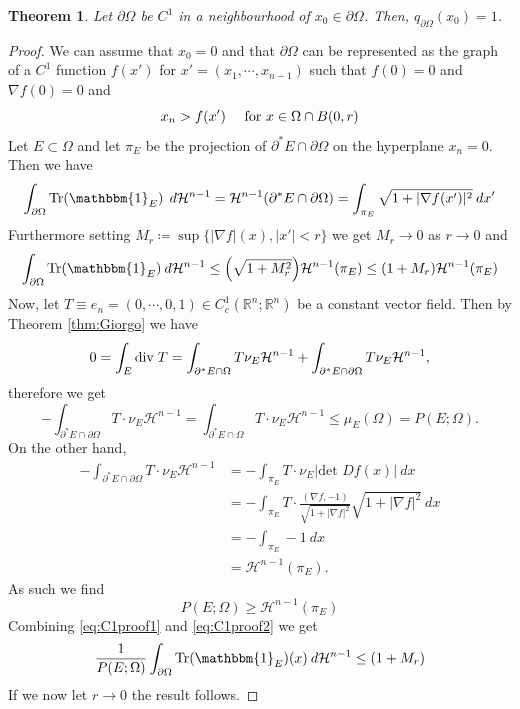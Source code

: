 \documentclass[artcle, 11pt, reqno]{amsart}
\numberwithin{equation}{section}
\newcommand{\R}{\mathbb{R}}
\newcommand{\Hd}{\mathcal{H}}
\newcommand{\pom}{{\partial \Omega}}
\newcommand{\ind}{\mathbbm{1}}
\newcommand{\contvf}{C^1_c(\R^n; \R^n)}
\newcommand{\dd}{\: d}
\newcommand{\divv}{\textnormal{div} \;}
\DeclareMathOperator{\Tr}{Tr}
\theoremstyle{plain}
\newtheorem{theorem}{Theorem}
\theoremstyle{definition}
\theoremstyle{remark}
\begin{document}
	\begin{theorem} \label{thm:Giusti}
		Let $\pom$ be $C^1$ in a neighbourhood of $x_0 \in \pom$. Then, $q_{\pom}(x_0) = 1$.
	\end{theorem}
	
	\begin{proof}
		We can assume that $x_0=0$ and that $\pom$ can be represented as the graph of a $C^1$ function $f(x')$ for $x'=(x_1, \cdots, x_{n-1})$ such that $f(0)=0$ and $\nabla f(0) = 0$ and
		\[
		x_n > f(x') \quad \textnormal{ for } x \in \Omega \cap B(0,r) 
		\]
		Let $E \subset \Omega$ and let $\pi_E$ be the projection of  $\partial^\ast E \cap \pom$ on the hyperplane $x_n=0$. Then we have 
		\begin{equation*}
			\int_{\pom} \Tr(\ind_E) \: \dd \Hd^{n-1} = \Hd^{n-1}(\partial^\ast E \cap \pom) = \int_{\pi_E} \sqrt{1+|\nabla f(x')|^2} \dd x'
		\end{equation*}
		Furthermore setting $M_r \coloneqq \sup \{|\nabla f|(x), |x'| < r \}$ we get $M_r \rightarrow 0$ as $r \rightarrow 0$ and 
		\begin{equation} \label{eq:C1proof1}
			\int_\pom \Tr(\ind_E) \dd \Hd^{n-1} \leq
			\Bigl(\sqrt{1+M_r^2}\Bigr)\Hd^{n-1}(\pi_E)
			\leq
			(1+M_r)\Hd^{n-1}(\pi_E)
		\end{equation} 
		Now, let $T  \equiv e_n = (0, \cdots, 0, 1) \in \contvf$ be a constant vector field. Then by Theorem \ref{thm:Giorgo} we have
		\[
		0 = \int_E \divv T = \int_{\partial^\ast E \cap \Omega} T \nu_E \Hd^{n-1} + \int_{\partial^\ast E \cap \partial \Omega} T \nu_E \Hd^{n-1},  
		\]
		therefore  we get 
		\[
		- \int_{\partial^\ast E \cap \partial \Omega} T \cdot \nu_E \Hd^{n-1} = \int_{\partial^\ast E \cap \Omega} T \cdot \nu_E \Hd^{n-1} \leq \mu_E(\Omega) = P(E;\Omega). 
		\]
		On the other hand, 
		\begin{align*}
			-\int_{\partial^\ast E \cap \partial \Omega} T \cdot \nu_E \Hd^{n-1} &= -\int_{\pi_E} T \cdot \nu_E |\text{det } Df(x)| \dd x \\
			&= -\int_{\pi_E} T \cdot \frac{(\nabla f, -1)}{\sqrt{1+|\nabla f|^2}} \sqrt{1+|\nabla f|^2} \dd x \\
			&= - \int_{\pi_E} -1 \dd x \\
			&= \Hd^{n-1}(\pi_E).
		\end{align*}
		As such we find
		\begin{equation} \label{eq:C1proof2}
			P(E;\Omega) \geq \Hd^{n-1}(\pi_E)
		\end{equation}
		Combining \eqref{eq:C1proof1} and \eqref{eq:C1proof2} we get
		\begin{equation}
			\frac{1}{P(E;\Omega)} \int_\pom \Tr(\ind_E)(x) \dd\Hd^{n-1} \leq (1+M_r)
		\end{equation}
		If we now let $r \rightarrow 0$ the result follows.
	\end{proof}
	
\end{document}
